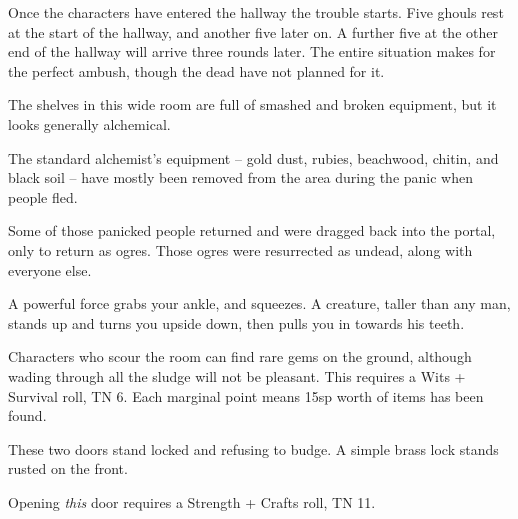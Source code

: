 \begin{multicols}{2}
Once the characters have entered the hallway the trouble starts.  Five ghouls rest at the start of the hallway, and another five later on.  A further five at the other end of the hallway will arrive three rounds later.
The entire situation makes for the perfect ambush, though the dead have not planned for it.


\ghoul


\begin{boxtext}

	The shelves in this wide room are full of smashed and broken equipment, but it looks generally alchemical.

\end{boxtext}

The standard alchemist's equipment -- gold dust, rubies, beachwood, chitin, and black soil -- have mostly been removed from the area during the panic when people fled.

Some of those panicked people returned and were dragged back into the portal, only to return as ogres.  Those ogres were resurrected as undead, along with everyone else.

\begin{boxtext}

	A powerful force grabs your ankle, and squeezes.
	A creature, taller than any man, stands up and turns you upside down, then pulls you in towards his teeth.

\end{boxtext}



Characters who scour the room can find rare gems on the ground, although wading through all the sludge will not be pleasant.
This requires a Wits + Survival roll, TN 6.
Each marginal point means 15sp worth of items has been found.


\begin{boxtext}

	These two doors stand locked and refusing to budge.  A simple brass lock stands rusted on the front.

\end{boxtext}

Opening \emph{this} door requires a Strength + Crafts roll, TN 11.


\end{multicols}
